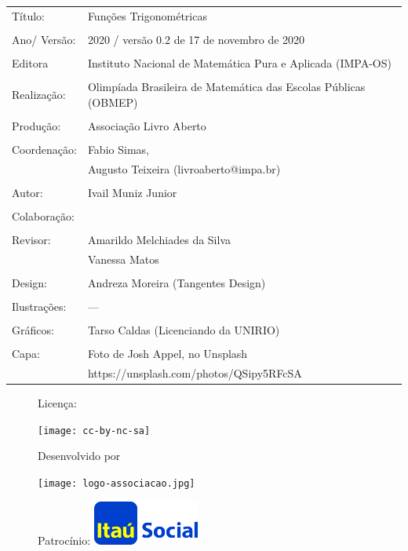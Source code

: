 \begin{tabular}{p{}p{}}
Título: & Funções Trigonométricas\\
\\
Ano/ Versão: & 2020 / versão 0.2 de 17 de novembro de 2020\\
\\
Editora & Instituto Nacional de Matem\'atica Pura e Aplicada (IMPA-OS)\\
\\
Realização:& Olimp\'iada Brasileira de Matem\'atica das Escolas P\'ublicas (OBMEP)\\
\\
Produção:& Associação Livro Aberto\\
\\
Coordenação: & Fabio Simas, \\
			&  Augusto Teixeira (livroaberto@impa.br)\\
\\
  Autor: & Ivail Muniz Junior\\
        
\\
Colaboração: & \\
\\
Revisor: & Amarildo Melchiades da Silva \\
         & Vanessa Matos \\
\\
Design: & Andreza Moreira (Tangentes Design) \\
\\
  Ilustrações: & --- \\ 
\\
Gráficos: & Tarso Caldas (Licenciando da UNIRIO)\\
\\
  Capa: & Foto de Josh Appel, no Unsplash \\
  		& https://unsplash.com/photos/QSipy5RFcSA \\

\end{tabular}
\vspace{.5cm}



\begin{figure}[b]
\begin{minipage}[l]{5cm}
\centering

{\large Licença:}

  \texttt{[image: cc-by-nc-sa]}
\end{minipage}\hfill
\begin{minipage}[c]{5cm}
\centering
{\large Desenvolvido por}

\texttt{[image: logo-associacao.jpg]}
\end{minipage}
\begin{minipage}[r]{5cm}
\centering

{\large Patrocínio:}
  \vspace{1em}
  \includegraphics[width=3.5cm]{itau}
\end{minipage}
\end{figure}

